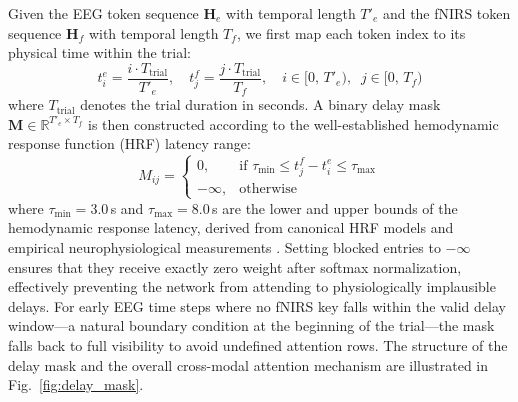 \documentclass[preprint,12pt,authoryear]{elsarticle}
\begin{document}
Given the EEG token sequence $\mathbf{H}_e$ with temporal length $T'_e$ and the fNIRS token sequence $\mathbf{H}_f$ with temporal length $T_f$, we first map each token index to its physical time within the trial:
\begin{equation}
\label{eq:time_positions}
t_i^{e} = \frac{i \cdot T_{\mathrm{trial}}}{T'_e}, \quad t_j^{f} = \frac{j \cdot T_{\mathrm{trial}}}{T_f}, \quad i \in [0,\, T'_e),\;\; j \in [0,\, T_f)
\end{equation}
where $T_{\mathrm{trial}}$ denotes the trial duration in seconds. A binary delay mask $\mathbf{M} \in \mathbb{R}^{T'_e \times T_f}$ is then constructed according to the well-established hemodynamic response function (HRF) latency range:
\begin{equation}
\label{eq:delay_mask}
M_{ij} = \begin{cases}
0, & \text{if } \tau_{\min} \leq t_j^{f} - t_i^{e} \leq \tau_{\max} \\[4pt]
-\infty, & \text{otherwise}
\end{cases}
\end{equation}
where $\tau_{\min} = 3.0$\,s and $\tau_{\max} = 8.0$\,s are the lower and upper bounds of the hemodynamic response latency, derived from canonical HRF models and empirical neurophysiological measurements \citep{buxton1998dynamics, lindquist2009modeling}. Setting blocked entries to $-\infty$ ensures that they receive exactly zero weight after softmax normalization, effectively preventing the network from attending to physiologically implausible delays. For early EEG time steps where no fNIRS key falls within the valid delay window---a natural boundary condition at the beginning of the trial---the mask falls back to full visibility to avoid undefined attention rows. The structure of the delay mask and the overall cross-modal attention mechanism are illustrated in Fig.~\ref{fig:delay_mask}.
\end{document}
